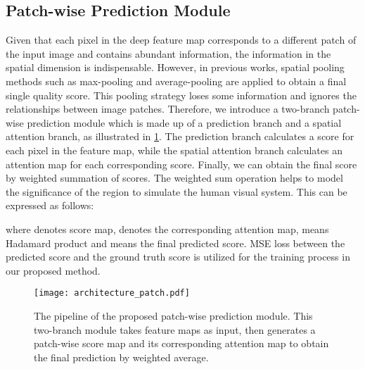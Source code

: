 \documentclass[10pt,twocolumn,letterpaper]{article}
\begin{document}
\subsection{Patch-wise Prediction Module}
\label{subsec:pooling}
Given that each pixel in the deep feature map corresponds to a different patch of the input image and contains abundant information, the information in the spatial dimension is indispensable. However, in previous works, spatial pooling methods such as max-pooling and average-pooling are applied to obtain a final single quality score. This pooling strategy loses some information and ignores the relationships between image patches. Therefore, we introduce a two-branch patch-wise prediction module which is made up of a prediction branch and a spatial attention branch, as illustrated in \cref{fig:pixel}. The prediction branch calculates a score for each pixel in the feature map, while the spatial attention branch calculates an attention map for each corresponding score. Finally, we can obtain the final score by weighted summation of scores. The weighted sum operation helps to model the significance of the region to simulate the human visual system. This can be expressed as follows:

where  denotes score map,  denotes the corresponding attention map,  means Hadamard product and  means the final predicted score. MSE loss between the predicted score and the ground truth score is utilized for the training process in our proposed method.

\begin{figure}[th]
\centering
\texttt{[image: architecture\_patch.pdf]}
\caption{The pipeline of the proposed patch-wise prediction module. This two-branch module takes feature maps as input, then generates a patch-wise score map and its corresponding attention map to obtain the final prediction by weighted average.}
\label{fig:pixel}
\end{figure}
\end{document}
